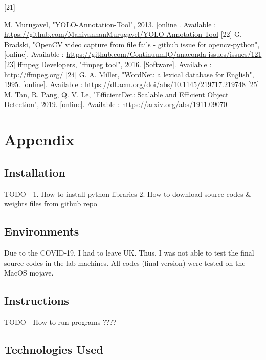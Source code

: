 \documentclass{article}
\begin{document}
\newline
\hypertarget{ref21}{[21]} M. Murugavel, "YOLO-Annotation-Tool", 2013. [online]. Available :  \url{https://github.com/ManivannanMurugavel/YOLO-Annotation-Tool}
\newline
\hypertarget{ref22}{[22]} G. Bradski, "OpenCV video capture from file fails - github issue for opencv-python", [online]. Available : \url{https://github.com/ContinuumIO/anaconda-issues/issues/121}
\newline
\hypertarget{ref23}{[23]} ffmpeg Developers, "ffmpeg tool", 2016. [Software]. Available : \url{http://ffmpeg.org/}
\newline
\hypertarget{ref24}{[24]} G. A. Miller, "WordNet: a lexical database for English", 1995. [online]. Available : \url{https://dl.acm.org/doi/abs/10.1145/219717.219748}
\newline
\hypertarget{ref25}{[25]} M. Tan, R. Pang, Q. V. Le, "EfficientDet: Scalable and Efficient Object Detection", 2019. [online]. Available : \url{https://arxiv.org/abs/1911.09070}
\newline

\newpage

\section{Appendix}

\subsection{Installation}

TODO - 1. How to install python libraries  2. How to download source codes \& weights files from github repo

\subsection{Environments}

Due to the COVID-19, I had to leave UK. Thus, I was not able to test the final source codes in the lab machines. All codes (final version) were tested on the MacOS mojave.

\subsection{Instructions}

TODO - How to run programs ????

\subsection{Technologies Used}
\end{document}
